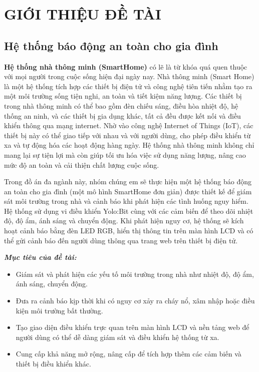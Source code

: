 \newpage
\section{GIỚI THIỆU ĐỀ TÀI}

\subsection{Hệ thống báo động an toàn cho gia đình}

\textbf{Hệ thống nhà thông minh (SmartHome)} có lẽ là từ khóa quá quen thuộc với mọi người trong cuộc sống hiện đại ngày nay. Nhà thông minh (Smart Home) là một hệ thống tích hợp các thiết bị điện tử và công nghệ tiên tiến nhằm tạo ra một môi trường sống tiện nghi, an toàn và tiết kiệm năng lượng. Các thiết bị trong nhà thông minh có thể bao gồm đèn chiếu sáng, điều hòa nhiệt độ, hệ thống an ninh, và các thiết bị gia dụng khác, tất cả đều được kết nối và điều khiển thông qua mạng internet. Nhờ vào công nghệ Internet of Things (IoT), các thiết bị này có thể giao tiếp với nhau và với người dùng, cho phép điều khiển từ xa và tự động hóa các hoạt động hàng ngày. Hệ thống nhà thông minh không chỉ mang lại sự tiện lợi mà còn giúp tối ưu hóa việc sử dụng năng lượng, nâng cao mức độ an toàn và cải thiện chất lượng cuộc sống.

Trong đồ án đa ngành này, nhóm chúng em sẽ thực hiện một hệ thống báo động an toàn cho gia đình (một mô hình SmartHome đơn giản) được thiết kế để giám sát môi trường trong nhà và cảnh báo khi phát hiện các tình huống nguy hiểm. Hệ thống sử dụng vi điều khiển Yolo:Bit cùng với các cảm biến để theo dõi nhiệt độ, độ ẩm, ánh sáng và chuyển động. Khi phát hiện nguy cơ, hệ thống sẽ kích hoạt cảnh báo bằng đèn LED RGB, hiển thị thông tin trên màn hình LCD và có thể gửi cảnh báo đến người dùng thông qua trang web trên thiết bị điện tử.

\textbf{\textit{Mục tiêu của đề tài:}}
\begin{itemize}
    \item Giám sát và phát hiện các yếu tố môi trường trong nhà như nhiệt độ, độ ẩm, ánh sáng, chuyển động.
    \item Đưa ra cảnh báo kịp thời khi có nguy cơ xảy ra cháy nổ, xâm nhập hoặc điều kiện môi trường bất thường.
    \item Tạo giao diện điều khiển trực quan trên màn hình LCD và nền tảng web để người dùng có thể dễ dàng giám sát và điều khiển hệ thống từ xa.
    \item Cung cấp khả năng mở rộng, nâng cấp để tích hợp thêm các cảm biến và thiết bị điều khiển khác.
\end{itemize}


